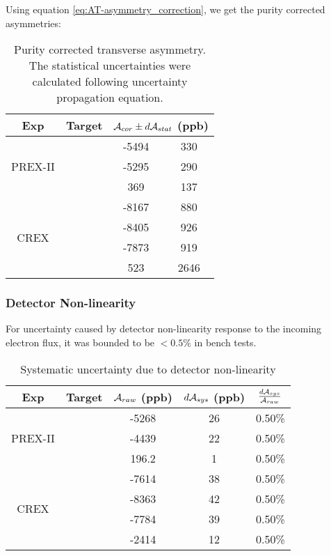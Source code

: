Using equation \ref{eq:AT-asymmetry_correction}, we get the purity corrected
asymmetries:
\begin{table}
    \centering
    \begin{tabular}{c c | c c }
	\hline
	Exp & Target	
	& \multicolumn{2}{c}{$\mathcal{A}_{cor}  \pm d\mathcal{A}_{stat}$ (ppb)}	    \\
	\hline
	\multirow{3}{*}{PREX-II}
	    & \C    & -5494	& 330	 \\ 
	    & \Ca   & -5295	& 290	 \\ 
	    & \Pb   & 369	& 137	 \\ 
	\hline
	\multirow{4}{*}{CREX}
	    & \C    & -8167	& 880	 \\ 
	    & \ca   & -8405	& 926	 \\ 
	    & \Ca   & -7873	& 919	 \\ 
	    & \Pb   & 523	& 2646	 \\ 
	\hline
    \end{tabular}
    \caption{Purity corrected transverse asymmetry. The statistical uncertainties
    were calculated following uncertainty propagation equation.}
\end{table}

\subsubsection{Detector Non-linearity}
For uncertainty caused by detector non-linearity response to the incoming electron flux,
it was bounded to be $<0.5\%$ in bench tests.
\begin{table}[!h]
    \centering
    \begin{tabular}{c c | c c c}
	\hline
	Exp & Target	& $\mathcal{A}_{raw}$ (ppb) & $d\mathcal{A}_{sys}$ (ppb)    & $\frac{d\mathcal{A}_{sys}}{\mathcal{A}_{raw}}$   \\
	\hline
	\multirow{3}{*}{PREX-II}
	    & \C    & -5268	& 26	& 0.50\%    \\ 
	    & \ca   & -4439	& 22	& 0.50\%    \\ 
	    & \Pb   & 196.2	& 1	& 0.50\%    \\ 
	\hline
	\multirow{4}{*}{CREX}
	    & \C    & -7614	& 38	& 0.50\%    \\ 
	    & \ca   & -8363	& 42	& 0.50\%    \\ 
	    & \Ca   & -7784	& 39	& 0.50\%    \\ 
	    & \Pb   & -2414	& 12	& 0.50\%    \\ 
	\hline
    \end{tabular}
    \caption{Systematic uncertainty due to detector non-linearity}
\end{table}

